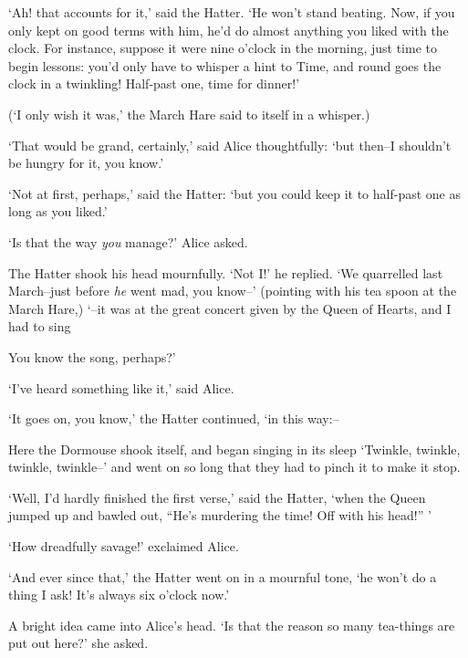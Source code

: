   `Ah! that accounts for it,' said the Hatter.  `He won't stand
beating.  Now, if you only kept on good terms with him, he'd do
almost anything you liked with the clock.  For instance, suppose
it were nine o'clock in the morning, just time to begin lessons:
you'd only have to whisper a hint to Time, and round goes the
clock in a twinkling!  Half-past one, time for dinner!'

  (`I only wish it was,' the March Hare said to itself in a
whisper.)

  `That would be grand, certainly,' said Alice thoughtfully:
`but then--I shouldn't be hungry for it, you know.'

  `Not at first, perhaps,' said the Hatter:  `but you could keep
it to half-past one as long as you liked.'

  `Is that the way {\it you} manage?' Alice asked.

  The Hatter shook his head mournfully.  `Not I!' he replied.
`We quarrelled last March--just before {\it he} went mad, you know--'
(pointing with his tea spoon at the March Hare,) `--it was at the
great concert given by the Queen of Hearts, and I had to sing
\onelineskip
{}
\onelineskip

You know the song, perhaps?'

  `I've heard something like it,' said Alice.

  `It goes on, you know,' the Hatter continued, `in this way:--

\onelineskip
{}
\onelineskip

Here the Dormouse shook itself, and began singing in its sleep
`Twinkle, twinkle, twinkle, twinkle--' and went on so long that
they had to pinch it to make it stop.

  `Well, I'd hardly finished the first verse,' said the Hatter,
`when the Queen jumped up and bawled out, ``He's murdering the
time!  Off with his head!'' '

  `How dreadfully savage!' exclaimed Alice.

  `And ever since that,' the Hatter went on in a mournful tone,
`he won't do a thing I ask!  It's always six o'clock now.'

  A bright idea came into Alice's head.  `Is that the reason so
many tea-things are put out here?' she asked.


